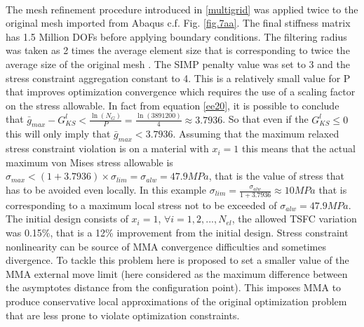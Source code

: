          \\
     The mesh refinement procedure introduced in \ref{multigrid} was applied twice to the original mesh imported from Abaqus c.f. Fig. \ref{fig.7aa}.
    The final stiffness matrix has 1.5 Million DOFs before applying boundary conditions. The filtering radius was taken as 2 times the average element size that is corresponding to twice the average size of the original mesh . The SIMP penalty value was set to 3 and the stress constraint aggregation constant to 4.
     This is a relatively small value for P that improves optimization convergence which requires the use of a scaling factor on the stress allowable. In fact from equation \ref{ee20}, it is possible to conclude that $\bar{g}_{max}-G^{l}_{KS}<\frac{\ln\left(N_G\right)}{P}=\frac{\ln\left(3891200\right)}{4}\approx 3.7936$. So that even if the $G^{l}_{KS}\leq0$ this will only imply that $\bar{g}_{max}< 3.7936$. Assuming that the maximum relaxed stress constraint violation is on a material with $x_i=1$ this means that the actual maximum von Mises stress allowable is $ \sigma_{max}<(1+3.7936)\times \sigma_{lim} = \sigma_{alw}=47.9 MPa$, that is the value of stress that has to be avoided even locally. In this example $\sigma_{lim}=\frac{\sigma_{alw}}{1+3.7936}\approx 10 MPa$ that is corresponding to a maximum local stress not to be exceeded of $\sigma_{alw}=47.9MPa$.
     The initial design consists of $x_i=1$, $\forall i=1,2,...,N_{el}$, the allowed TSFC variation was 0.15\%, that is a 12\% improvement from the initial design.
    Stress constraint nonlinearity can be source of MMA convergence difficulties and sometimes divergence. To tackle this problem here is proposed to set a smaller value of the MMA external move limit (here considered as the maximum difference between the asymptotes distance from the configuration point). This imposes MMA to produce conservative local approximations of the original optimization problem that are less prone to violate optimization constraints.
